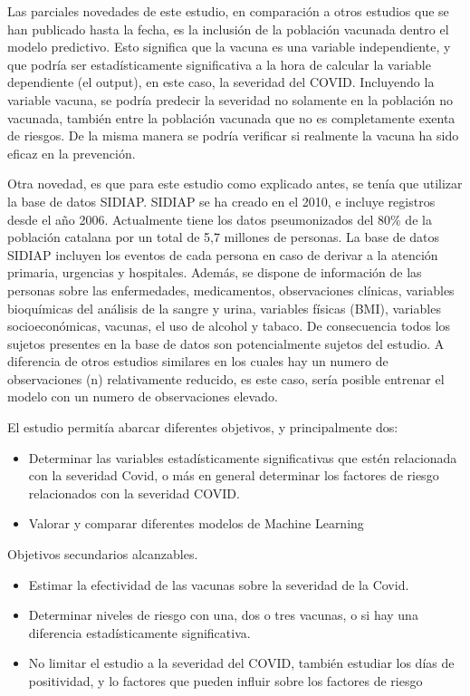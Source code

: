 \documentclass[
]{article}
\begin{document}
Las parciales novedades de este estudio, en comparación a otros estudios
que se han publicado hasta la fecha, es la inclusión de la población
vacunada dentro el modelo predictivo. Esto significa que la vacuna es
una variable independiente, y que podría ser estadísticamente
significativa a la hora de calcular la variable dependiente (el output),
en este caso, la severidad del COVID. Incluyendo la variable vacuna, se
podría predecir la severidad no solamente en la población no vacunada,
también entre la población vacunada que no es completamente exenta de
riesgos. De la misma manera se podría verificar si realmente la vacuna
ha sido eficaz en la prevención.

Otra novedad, es que para este estudio como explicado antes, se tenía
que utilizar la base de datos SIDIAP. SIDIAP se ha creado en el 2010, e
incluye registros desde el año 2006. Actualmente tiene los datos
pseumonizados del 80\% de la población catalana por un total de 5,7
millones de personas. La base de datos SIDIAP incluyen los eventos de
cada persona en caso de derivar a la atención primaria, urgencias y
hospitales. Además, se dispone de información de las personas sobre las
enfermedades, medicamentos, observaciones clínicas, variables
bioquímicas del análisis de la sangre y urina, variables físicas (BMI),
variables socioeconómicas, vacunas, el uso de alcohol y tabaco. De
consecuencia todos los sujetos presentes en la base de datos son
potencialmente sujetos del estudio. A diferencia de otros estudios
similares en los cuales hay un numero de observaciones (n) relativamente
reducido, es este caso, sería posible entrenar el modelo con un numero
de observaciones elevado.

El estudio permitía abarcar diferentes objetivos, y principalmente dos:

\begin{itemize}
\item
  Determinar las variables estadísticamente significativas que estén
  relacionada con la severidad Covid, o más en general determinar los
  factores de riesgo relacionados con la severidad COVID.
\item
  Valorar y comparar diferentes modelos de Machine Learning
\end{itemize}

Objetivos secundarios alcanzables.

\begin{itemize}
\item
  Estimar la efectividad de las vacunas sobre la severidad de la Covid.
\item
  Determinar niveles de riesgo con una, dos o tres vacunas, o si hay una
  diferencia estadísticamente significativa.
\item
  No limitar el estudio a la severidad del COVID, también estudiar los
  días de positividad, y lo factores que pueden influir sobre los
  factores de riesgo
\end{itemize}
\end{document}
